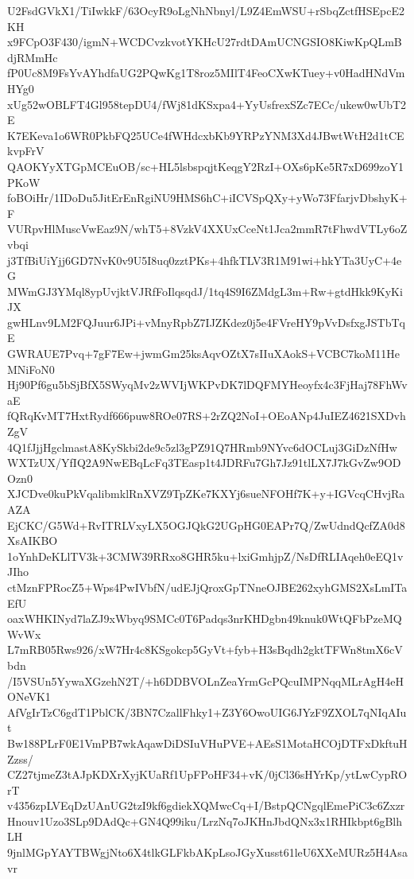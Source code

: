 U2FsdGVkX1/TiIwkkF/63OcyR9oLgNhNbnyl/L9Z4EmWSU+rSbqZctfHSEpcE2KH
x9FCpO3F430/igmN+WCDCvzkvotYKHcU27rdtDAmUCNGSIO8KiwKpQLmBdjRMmHc
fP0Uc8M9FsYvAYhdfaUG2PQwKg1T8roz5MIlT4FeoCXwKTuey+v0HadHNdVmHYg0
xUg52wOBLFT4Gl958tepDU4/fWj81dKSxpa4+YyUsfrexSZc7ECc/ukew0wUbT2E
K7EKeva1o6WR0PkbFQ25UCe4fWHdcxbKb9YRPzYNM3Xd4JBwtWtH2d1tCEkvpFrV
QAOKYyXTGpMCEuOB/sc+HL5lsbspqjtKeqgY2RzI+OXs6pKe5R7xD699zoY1PKoW
foBOiHr/1IDoDu5JitErEnRgiNU9HMS6hC+iICVSpQXy+yWo73FfarjvDbshyK+F
VURpvHlMuscVwEaz9N/whT5+8VzkV4XXUxCceNt1Jca2mmR7tFhwdVTLy6oZvbqi
j3TfBiUiYjj6GD7NvK0v9U5I8uq0zztPKs+4hfkTLV3R1M91wi+hkYTa3UyC+4eG
MWmGJ3YMql8ypUvjktVJRfFoIlqsqdJ/1tq4S9I6ZMdgL3m+Rw+gtdHkk9KyKiJX
gwHLnv9LM2FQJuur6JPi+vMnyRpbZ7IJZKdez0j5e4FVreHY9pVvDsfxgJSTbTqE
GWRAUE7Pvq+7gF7Ew+jwmGm25ksAqvOZtX7sIIuXAokS+VCBC7koM11HeMNiFoN0
Hj90Pf6gu5bSjBfX5SWyqMv2zWVIjWKPvDK7lDQFMYHeoyfx4c3FjHaj78FhWvaE
fQRqKvMT7HxtRydf666puw8ROe07RS+2rZQ2NoI+OEoANp4JuIEZ4621SXDvhZgV
4Q1fJjjHgclmastA8KySkbi2de9c5zl3gPZ91Q7HRmb9NYvc6dOCLuj3GiDzNfHw
WXTzUX/YfIQ2A9NwEBqLcFq3TEasp1t4JDRFu7Gh7Jz91tlLX7J7kGvZw9ODOzn0
XJCDve0kuPkVqalibmklRnXVZ9TpZKe7KXYj6sueNFOHf7K+y+IGVcqCHvjRaAZA
EjCKC/G5Wd+RvITRLVxyLX5OGJQkG2UGpHG0EAPr7Q/ZwUdndQcfZA0d8XsAIKBO
1oYnhDeKLlTV3k+3CMW39RRxo8GHR5ku+lxiGmhjpZ/NsDfRLIAqeh0eEQ1vJIho
ctMznFPRocZ5+Wps4PwIVbfN/udEJjQroxGpTNneOJBE262xyhGMS2XsLmITaEfU
oaxWHKINyd7laZJ9xWbyq9SMCc0T6Padqs3nrKHDgbn49knuk0WtQFbPzeMQWvWx
L7mRB05Rws926/xW7Hr4c8KSgokcp5GyVt+fyb+H3sBqdh2gktTFWn8tmX6cVbdn
/I5VSUn5YywaXGzehN2T/+h6DDBVOLnZeaYrmGcPQcuIMPNqqMLrAgH4eHONeVK1
AfVgIrTzC6gdT1PblCK/3BN7CzallFhky1+Z3Y6OwoUIG6JYzF9ZXOL7qNIqAIut
Bw188PLrF0E1VmPB7wkAqawDiDSIuVHuPVE+AEsS1MotaHCOjDTFxDkftuHZzss/
CZ27tjmeZ3tAJpKDXrXyjKUaRf1UpFPoHF34+vK/0jCl36sHYrKp/ytLwCypROrT
v4356zpLVEqDzUAnUG2tzI9kf6gdiekXQMwcCq+I/BstpQCNgqlEmePiC3c6Zxzr
Hnouv1Uzo3SLp9DAdQc+GN4Q99iku/LrzNq7oJKHnJbdQNx3x1RHIkbpt6gBlhLH
9jnlMGpYAYTBWgjNto6X4tlkGLFkbAKpLsoJGyXusst61leU6XXeMURz5H4Asavr
